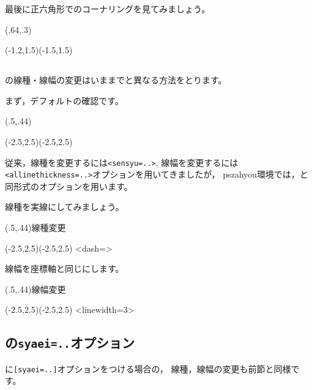 \documentclass[a4j]{jarticle}
\begin{document}
最後に正六角形でのコーナリングを見てみましょう。

\begin{showEx}(.64,.3){}
\begin{pszahyou*}[ul=10mm](-1.2,1.5)(-1.5,1.5)
  \Takakkei{\A\B\C\D\E\F}%
\end{pszahyou*}
\end{showEx}

\subsection{\texorpdfstring{}{zahyouMemori}}
の線種・線幅の変更はいままでと異なる方法をとります。

まず，デフォルトの確認です。

\begin{showEx}(.5,.44){}
\begin{pszahyou}[ul=8mm]%
    (-2.5,2.5)(-2.5,2.5)
  \zahyouMemori[g]
\end{pszahyou}
\end{showEx}

従来，線種を変更するには\verb+<sensyu=..>+, 
線幅を変更するには\verb+<allinethickness=..>+オプションを用いてきましたが，
\textsf{pszahyou}環境では，と同形式のオプションを用います。

線種を実線にしてみましょう。

\begin{showEx}(.5,.44){線種変更}
\begin{pszahyou}[ul=8mm]%
    (-2.5,2.5)(-2.5,2.5)
  \zahyouMemori[g]<dash={}>
\end{pszahyou}
\end{showEx}

線幅を座標軸と同じにします。

\begin{showEx}(.5,.44){線幅変更}
\begin{pszahyou}[ul=8mm]%
    (-2.5,2.5)(-2.5,2.5)
  \zahyouMemori[g]<linewidth=3>
\end{pszahyou}
\end{showEx}

\subsection{\texorpdfstring{}{Put}の\texttt{syaei=..}オプション}
に\verb+[syaei=..]+オプションをつける場合の，
線種，線幅の変更も前節と同様です。
\end{document}
